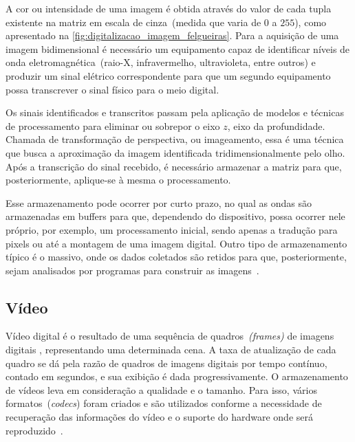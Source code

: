 \documentclass[12pt,oneside,a4paper,chapter=TITLE,section=TITLE,sumario=tradicional]{abntex2}
\begin{document}
A cor ou intensidade de uma imagem é obtida através do valor de cada tupla existente na matriz em escala de cinza~(medida que varia de $0$ a $255$), como apresentado na \autoref{fig:digitalizacao_imagem_felgueiras}. Para a aquisição de uma imagem bidimensional é necessário um equipamento capaz de identificar níveis de onda eletromagnética~(raio-X, infravermelho, ultravioleta, entre outros) e produzir um sinal elétrico correspondente para que um segundo equipamento possa transcrever o sinal físico para o meio digital.

\begin{figure}[htb]
\end{figure}

Os sinais identificados e transcritos passam pela aplicação de modelos e técnicas de processamento para eliminar ou sobrepor o eixo $z$, eixo da profundidade. Chamada de transformação de perspectiva, ou imageamento, essa é uma técnica que busca a aproximação da imagem identificada tridimensionalmente pelo olho.
Após a transcrição do sinal recebido, é necessário armazenar a matriz para que, posteriormente, aplique-se à mesma o processamento.

\newpage

Esse armazenamento pode ocorrer por curto prazo, no qual as ondas são armazenadas em buffers para que, dependendo do dispositivo, possa ocorrer nele próprio, por exemplo, um processamento inicial, sendo apenas a tradução para pixels ou até a montagem de uma imagem digital. Outro tipo de armazenamento típico é o massivo, onde os dados coletados são retidos para que, posteriormente, sejam analisados por programas para construir as imagens~\cite{pdi2006}.

\subsection{Vídeo}

Vídeo digital é o resultado de uma sequência de quadros~\textit{(frames)} de imagens digitais , representando uma determinada cena. A taxa de atualização de cada quadro se dá pela razão de quadros de imagens digitais por tempo contínuo, contado em segundos, e sua exibição é dada progressivamente.
O armazenamento de vídeos leva em consideração a qualidade e o tamanho. Para isso, vários formatos~(\textit{codecs}) foram criados e são utilizados conforme a necessidade de recuperação das informações do vídeo e o suporte do hardware onde será reproduzido~\cite[p.6]{de2013arquitetura}.
\end{document}
